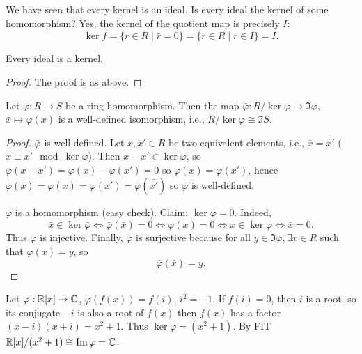 \documentclass[10pt, a4paper]{article}
\begin{document}
We have seen that every kernel is an ideal.
Is every ideal the kernel of some homomorphism?
Yes,
the kernel of the quotient map is precisely $I$:
\[
\ker{f} = \{r \in R \mid \bar{r} = \bar{0}\} = \{r \in R \mid r \in I\} = I.
\]

\begin{proposition}
    Every ideal is a kernel.

    \begin{proof}
        The proof is as above.
    \end{proof}
\end{proposition}

\begin{theorem}[FIT]
    Let $\varphi : R \to S$ be a ring homomorphism.
    Then the map $\bar{\varphi} : R / \ker{\varphi} \to \Im{\varphi}$,
    $\bar{x} \mapsto \varphi(x)$ is a well-defined isomorphism,
    i.e.,
    $R / \ker{\varphi} \cong \Im{S}$.

    \begin{proof}
        $\bar{\varphi}$ is well-defined.
        Let $x, x' \in R$ be two equivalent elements,
        i.e.,
        $\bar{x} = \bar{x'}$
        ($x \equiv x' \mod{\ker{\varphi}}$).
        Then $x - x' \in \ker{\varphi}$,
        so $\varphi(x - x') = \varphi(x) - \varphi(x') = 0$ so $\varphi(x) = \varphi(x')$,
        hence $\bar{\varphi}(\bar{x}) = \varphi(x) = \varphi(x') =  \bar{\varphi}(\bar{x'})$ so $\bar{\varphi}$ is well-defined.

        $\bar{\varphi}$ is a homomorphism
        (easy check).
        Claim:
        $\ker{\bar{\varphi}} = 0$.
        Indeed,
        \[
        \bar{x} \in \ker{\bar{\varphi}} \iff \bar{\varphi}(\bar{x}) = 0 \iff \varphi(x) = 0 \iff x \in \ker{\varphi} \iff \bar{x} = \bar{0}.
        \]
        Thus $\bar{\varphi}$ is injective.
        Finally,
        $\bar{\varphi}$ is surjective because for all $y \in \Im{\varphi}, \exists x \in R$ such that $\varphi(x) = y$,
        so
        \[
        \bar{\varphi}(\bar{x}) = y.
        \]
    \end{proof}
\end{theorem}

\begin{example}
    Let $\varphi : \mathbb{R}[x] \to \mathbb{C}$,
    $\varphi(f(x)) = f(i)$,
    $i ^ 2 = -1$.
    If $f(i) = 0$,
    then $i$ is a root,
    so its conjugate $-i$ is also a root of $f(x)$ then $f(x)$ has a factor $(x - i)(x + i) = x ^ 2 + 1$.
    Thus $\ker{\varphi} = (x ^ 2 + 1)$.
    By FIT $\mathbb{R}[x] / (x ^ 2 + 1)  \cong \mathrm{Im}\,{\varphi} = \mathbb{C}$.
\end{example}
\end{document}
